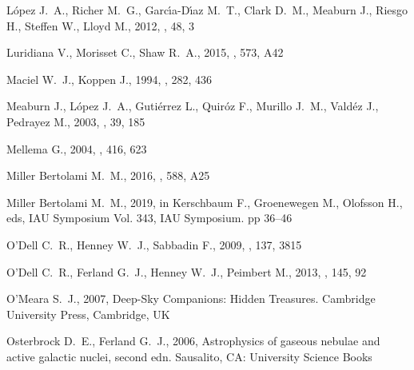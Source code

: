 \documentclass[useAMS, usenatbib]{mnras}
\begin{document}
\begin{thebibliography}{}
{L\'opez} J.~A.,  {Richer} M.~G.,  {Garc{\'{\i}}a-D{\'{\i}}az} M.~T.,  {Clark}
  D.~M.,  {Meaburn} J.,  {Riesgo} H.,  {Steffen} W.,   {Lloyd} M.,  2012,
  \rmxaa, 48, 3

{Luridiana} V.,  {Morisset} C.,   {Shaw} R.~A.,  2015, \aap, 573, A42

{Maciel} W.~J.,  {Koppen} J.,  1994, \aap, 282, 436

{Meaburn} J.,  {López} J.~A.,  {Gutiérrez} L.,  {Quiróz} F.,  {Murillo}
  J.~M.,  {Valdéz} J.,   {Pedrayez} M.,  2003, \rmxaa, 39, 185

{Mellema} G.,  2004, \aap, 416, 623

{Miller Bertolami} M.~M.,  2016, \aap, 588, A25

{Miller Bertolami} M.~M.,  2019, in {Kerschbaum} F.,  {Groenewegen} M.,
  {Olofsson} H.,  eds,  IAU Symposium Vol. 343, IAU Symposium. pp 36--46

{O'Dell} C.~R.,  {Henney} W.~J.,   {Sabbadin} F.,  2009, \aj, 137, 3815

{O'Dell} C.~R.,  {Ferland} G.~J.,  {Henney} W.~J.,   {Peimbert} M.,  2013, \aj,
  145, 92

O'Meara S.~J.,  2007, Deep-Sky Companions: Hidden Treasures.
Cambridge University Press, Cambridge, UK

{Osterbrock} D.~E.,  {Ferland} G.~J.,  2006, {Astrophysics of gaseous nebulae
  and active galactic nuclei}, second edn.
Sausalito, CA: University Science Books


\end{thebibliography}
\end{document}
